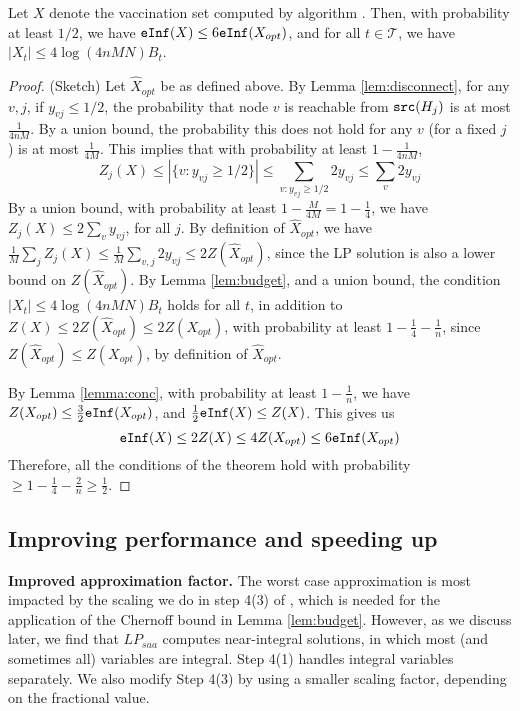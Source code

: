 \begin{theorem}
\label{theorem:algo}
Let $X$ denote the vaccination set computed by algorithm \algo{}.
Then, with probability at least $1/2$, we have
$\texttt{eInf}(X)\leq 6\texttt{eInf}(X_{opt})$, and for all $t\in\mathcal{T}$, we have
$|X_t|\leq 4\log(4nMN)B_t$.
\end{theorem}
\begin{proof} (Sketch)
Let $\hat{X}_{opt}$ be as defined above. 
By Lemma \ref{lem:disconnect}, for any $v, j$, if $y_{vj} \leq 1/2$, the probability that node $v$ is
reachable from $\texttt{src}(H_j)$ is at most $\frac{1}{4nM}$.
By a union bound, the probability this does not hold for any $v$ (for a fixed $j$) is at most $\frac{1}{4M}$.
This implies that with probability at least $1-\frac{1}{4nM}$, 
\[
Z_j(X)\leq |\{v: y_{vj}\geq 1/2\}|\leq \sum_{v: y_{vj}\geq 1/2} 2y_{vj} \leq \sum_v 2y_{vj}
\]
By a union bound, with probability at least $1-\frac{M}{4M}=1-\frac{1}{4}$,
we have $Z_j(X)\leq 2\sum_v y_{vj}$, for all $j$.
By definition of $\hat{X}_{opt}$, we have $\frac{1}{M}\sum_j Z_j(X)\leq \frac{1}{M}\sum_{v,j} 2y_{vj} \leq 2Z(\hat{X}_{opt})$,
since the LP solution is also a lower bound on $Z(\hat{X}_{opt})$.
By Lemma \ref{lem:budget}, and a union bound, the condition $|X_t|\leq 4\log(4nMN)B_t$ holds for all $t$,
in addition to $Z(X)\leq 2Z(\hat{X}_{opt})\leq 2Z(X_{opt})$, with probability at least $1-\frac{1}{4}-\frac{1}{n}$,
since $Z(\hat{X}_{opt})\leq Z(X_{opt})$, by definition of $\hat{X}_{opt}$.

By Lemma \ref{lemma:conc}, with probability at least $1-\frac{1}{n}$,
we have $Z(X_{opt})\leq \frac{3}{2}\texttt{eInf}(X_{opt})$, and
$\frac{1}{2}\texttt{eInf}(X)\leq Z(X)$. This gives us
\[
\texttt{eInf}(X)\leq 2Z(X)\leq 4Z(X_{opt})\leq 6\texttt{eInf}(X_{opt})
\]
Therefore, all the conditions of the theorem hold with probability $\geq 1-\frac{1}{4}-\frac{2}{n}\geq \frac{1}{2}$.
\end{proof}


\subsection{Improving performance and speeding up \algo{}}

\noindent
\textbf{Improved approximation factor.}
The worst case approximation is most impacted by the scaling we do in step 4(3) of \algo{}, which is needed
for the application of the Chernoff bound in Lemma \ref{lem:budget}. However, as we discuss later,
we find that $LP_{saa}$ computes near-integral solutions, in which most (and sometimes all) variables are integral.
Step 4(1) handles integral variables separately. We also modify Step 4(3) by using a smaller scaling factor,
depending on the fractional value.

